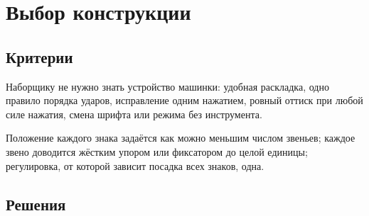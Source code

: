 \tableofcontents
\newpage

\section{Выбор конструкции}

\subsection{Критерии}

\begin{description}[style=nextline,leftmargin=0pt]
  \item[Простота в эксплуатации.] Наборщику не нужно знать устройство машинки: удобная раскладка, одно правило порядка ударов, исправление одним нажатием, ровный оттиск при любой силе нажатия, смена шрифта или режима без инструмента.
  \item[Точность механизма.] Положение каждого знака задаётся как можно меньшим числом звеньев; каждое звено доводится жёстким упором или фиксатором до целой единицы; регулировка, от которой зависит посадка всех знаков, одна.
\end{description}

\subsection{Решения}

